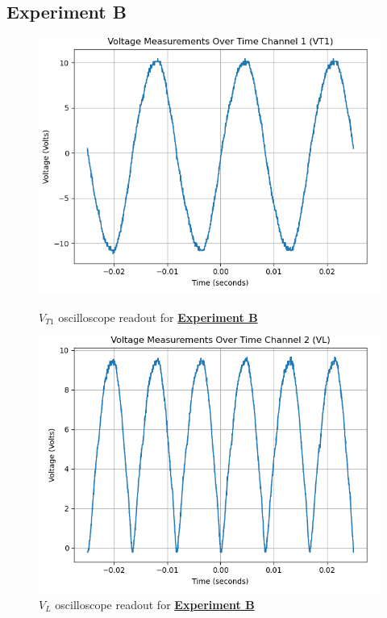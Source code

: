\documentclass[
	letterpaper
	12pt
]{template}
\newcommand{\bref}[2]{\textbf{\hyperref[#1]{#2}}}
\begin{document}
\subsection{Experiment B}

\begin{figure}[H]\label{data::B}
	\centering
	\begin{minipage}[c]{0.45\textwidth}
		\centering
		\includegraphics[width=\textwidth]{figures/B/1--ch1.png}
		\caption{$V_{T1}$ oscilloscope readout for \bref{exp::B}{Experiment B}}
	\end{minipage}
	\hfill
	\begin{minipage}[c]{0.45\textwidth}
		\centering
		\includegraphics[width=\textwidth]{figures/B/1--ch2.png}
		\caption{$V_{L}$ oscilloscope readout for \bref{exp::B}{Experiment B}}
	\end{minipage}
\end{figure}
\end{document}
